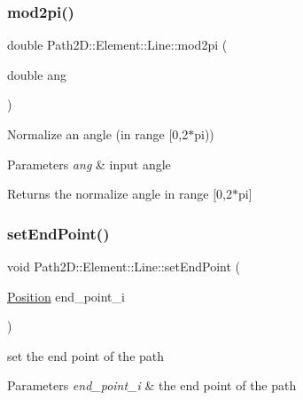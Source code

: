 \subsubsection{\texorpdfstring{mod2pi()}{mod2pi()}}
{\footnotesize\ttfamily double Path2\+D\+::\+Element\+::\+Line\+::mod2pi (\begin{DoxyParamCaption}\item[{double}]{ang }\end{DoxyParamCaption})}



Normalize an angle (in range \mbox{[}0,2$\ast$pi)) 


\begin{DoxyParams}{Parameters}
{\em ang} & input angle \\
\hline
\end{DoxyParams}
\begin{DoxyReturn}{Returns}
the normalize angle in range \mbox{[}0,2$\ast$pi\mbox{]} 
\end{DoxyReturn}
\mbox{\label{class_path2_d_1_1_element_1_1_line_a39675d1b58137465633f037aabfb57cc}} 
\subsubsection{\texorpdfstring{set\+End\+Point()}{setEndPoint()}}
{\footnotesize\ttfamily void Path2\+D\+::\+Element\+::\+Line\+::set\+End\+Point (\begin{DoxyParamCaption}\item[{\mbox{\hyperlink{class_path2_d_1_1_element_1_1_position}{Position}}}]{end\+\_\+point\+\_\+i }\end{DoxyParamCaption})}



set the end point of the path 


\begin{DoxyParams}{Parameters}
{\em end\+\_\+point\+\_\+i} & the end point of the path \\
\hline
\end{DoxyParams}
\mbox{\label{class_path2_d_1_1_element_1_1_line_ac18f28815c521092a2b1930647fae171}} 
